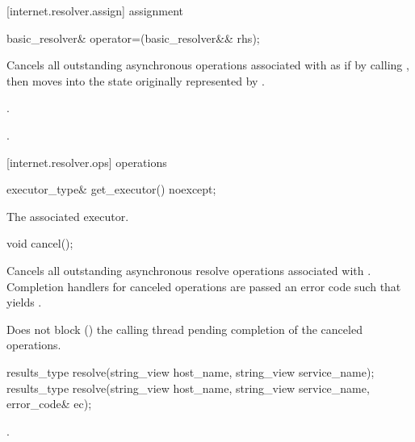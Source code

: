 [internet.resolver.assign]{ assignment}

\begin{itemdecl}
basic_resolver& operator=(basic_resolver&& rhs);
\end{itemdecl}

\begin{itemdescr}
\pnum
\effects Cancels all outstanding asynchronous operations associated with  as if by calling , then moves into  the state originally represented by .

\pnum
\postconditions {}.

\pnum
\returns {}.
\end{itemdescr}



[internet.resolver.ops]{ operations}

\begin{itemdecl}
executor_type& get_executor() noexcept;
\end{itemdecl}

\begin{itemdescr}
\pnum
\returns The associated executor.
\end{itemdescr}

\begin{itemdecl}
void cancel();
\end{itemdecl}

\begin{itemdescr}
\pnum
\effects Cancels all outstanding asynchronous resolve operations associated with . Completion handlers for canceled operations are passed an error code  such that  yields .

\pnum
\remarks Does not block () the calling thread pending completion of the canceled operations.
\end{itemdescr}

\begin{itemdecl}
results_type resolve(string_view host_name, string_view service_name);
results_type resolve(string_view host_name, string_view service_name,
                     error_code& ec);
\end{itemdecl}

\begin{itemdescr}
\pnum
\returns {}.
\end{itemdescr}

